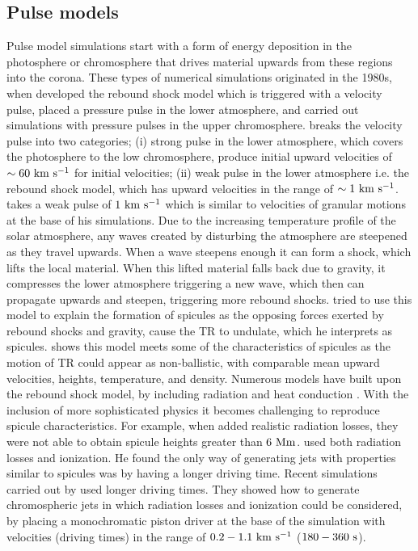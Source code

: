 \subsection{Pulse models}
\label{ssec:pulse_model}
Pulse model simulations start with a form of energy deposition in the photosphere or chromosphere that drives material upwards from these regions into the corona. These types of numerical simulations originated in the 1980s, when \cite{Hollweg1982ApJ257345H} developed the rebound shock model which is triggered with a velocity pulse, \cite{Suematsu1982SoPh7599S} placed a pressure pulse in the lower atmosphere, and  \cite{Shibata1982} carried out simulations with pressure pulses in the upper chromosphere. \cite{Sterling_2000SoPh} breaks the velocity pulse into two categories; (i) strong pulse in the lower atmosphere, which covers the photosphere to the low chromosphere, produce initial upward velocities of $\sim 60~\rm{km ~s^{-1}}$ for initial velocities; (ii) weak pulse in the lower atmosphere i.e. the rebound shock model, which has upward velocities in the range of $\sim 1 ~\rm{km ~s^{-1}}$. \np
%
\cite{Hollweg1982ApJ257345H} takes a weak pulse of $1~\rm{km ~s^{-1}}$ which is similar to velocities of granular motions at the base of his simulations. Due to the increasing temperature profile of the solar atmosphere, any waves created by disturbing the atmosphere are steepened as they travel upwards. When a wave steepens enough it can form a shock, which lifts the local material. When this lifted material falls back due to gravity, it compresses the lower atmosphere triggering a new wave, which then can propagate upwards and steepen, triggering more rebound shocks. \cite{Hollweg1982ApJ257345H} tried to use this model to explain the formation of spicules as the opposing forces exerted by rebound shocks and gravity, cause the TR to undulate, which he interprets as spicules. \cite{Hollweg1982ApJ257345H} shows this model meets some of the characteristics of spicules as the motion of TR could appear as non-ballistic, with comparable mean upward velocities, heights, temperature, and density. Numerous models have built upon the rebound shock model, by including radiation and heat conduction \citep{Sterling1988ApJ327950S, Sterling1990ApJ349647S, Cheng1992AA266549C, Cheng1992AA262581C, Cheng1992AA266537C}. With the inclusion of more sophisticated physics it becomes challenging to reproduce spicule characteristics. For example, when \cite{Sterling1990ApJ349647S} added realistic radiation losses, they were not able to obtain spicule heights greater than $6~\rm{Mm}$. \cite{Cheng1992AA266549C, Cheng1992AA266537C} used both radiation losses and ionization. He found the only way of generating jets with properties similar to spicules was by having a longer driving time. Recent simulations carried out by \cite{Heggland2007ApJ6661277H} used longer driving times. They showed how to generate chromospheric jets in which radiation losses and ionization could be considered, by placing a monochromatic piston driver at the base of the simulation with velocities (driving times) in the range of $0.2-1.1~\rm{km ~s^{-1}}$ ($180-360~\rm{s}$). \np
